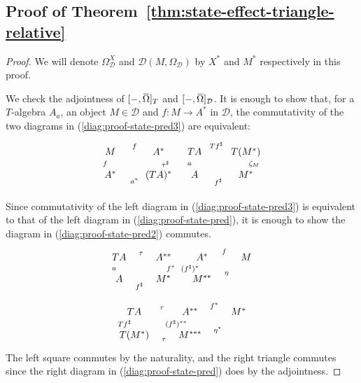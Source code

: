 \documentclass[9pt, preprint]{sigplanconf}
\theoremstyle{theorem}
\theoremstyle{definition}
\newcommand{\cat}[1]{\mathcal{#1}}
\renewcommand{\bar}{\overbar}
\newcommand{\overbar}[1]{\mkern 1.5mu\overline{\mkern-1.5mu#1\mkern-1.5mu}\mkern 1.5mu}
\newcommand{\place}{{-}}
\DeclarePairedDelimiter\p{(}{)}
\newcommand{\OmegaD}{\Omega_{\cat{D}}}
\begin{document}
\subsection{Proof of Theorem~\ref{thm:state-effect-triangle-relative}}
\begin{proof}
  We will denote
  $\OmegaD^X$ and $\cat{D}(M, \OmegaD)$ by $X^*$ and $M^*$ respectively
  in this proof.

  We check the adjointness of $[\place, \bar{\Omega}]_{T}$
  and $[\place, \bar{\Omega}]_{\cat{D}}$. It is enough to show
  that, for a $T$-algebra $A_a$, an object $M \in \cat{D}$ and
  $f \colon M \to A^*$ in $\cat{D}$,
  the commutativity of the two diagrams in (\ref{diag:proof-state-pred3})
  are equivalent:
  \begin{align}
    \label{diag:proof-state-pred3}
    \xymatrix@R-1.5em{
      M \ar[r]^{f} \ar[d]_{f}
      & A^* \ar[d]^{\tau^{\sharp}} \\
      A^* \ar[r]_{a^*}
      & (TA)^*
    } \quad
    \xymatrix@R-1.5em{
      TA \ar[r]^-{Tf^{\sharp}} \ar[d]_{a}
      & T \p*{M^*} \ar[d]^{\zeta_M} \\
      A \ar[r]_-{f^{\sharp}}
      & M^*
    }
  \end{align}

  Since commutativity of the left diagram in (\ref{diag:proof-state-pred3})
  is equivalent to that of the left diagram in (\ref{diag:proof-state-pred}),
  it is enough to show the diagram in (\ref{diag:proof-state-pred2})
  commutes.
  \begin{align}
    \label{diag:proof-state-pred}
      \xymatrix@R-1.5em{
        TA \ar[r]^-{\tau} \ar[d]_{a}
        & A^{**} \ar[d]^{f^*} \\
        A \ar[r]_-{f^{\sharp}}
        & M^*
      }
      \xymatrix@R-1.5em{
        A^*
        & M \ar[l]_{f} \ar[ld]^{\eta} \\
        M^{**} \ar[u]^{(f^{\sharp})^*}
      }
  \end{align}
  \begin{align}
    \label{diag:proof-state-pred2}
    \vcenter{
      \xymatrix@R-1.5em{
        TA \ar[r]^-{\tau} \ar[d]_{Tf^{\sharp}}
        & A^{**} \ar[r]^{f^*} \ar[d]_{(f^{\sharp})^{**}}
        & M^* \\
        T \p*{M^*} \ar[r]_-{\tau}
        & M^{***} \ar[ur]_{\eta^*}
      }
    }
  \end{align}
  The left square commutes
  by the naturality, and the right triangle commutes since
  the right diagram in (\ref{diag:proof-state-pred})
  does by the adjointness.
\end{proof}
\end{document}
